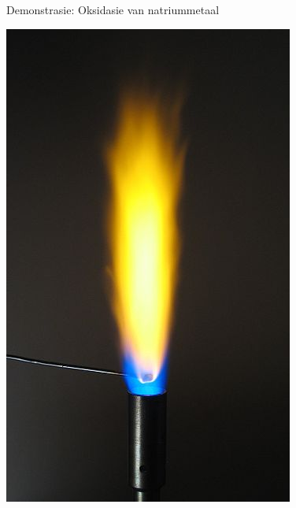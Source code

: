 {{\begin{g_experiment}{Demonstrasie: Oksidasie van natriummetaal}
\begin{minipage}{.6\textwidth}
\par \label{m38719*eip-980}
\end{minipage}
\begin{minipage}{.4\textwidth}
 \begin{center}
  \includegraphics[width=.5\textwidth]{photos/sodium_flame_soren_wedel_nielsen_wikipedia.jpg}
 \end{center}

\end{minipage}


\end{g_experiment}}}
